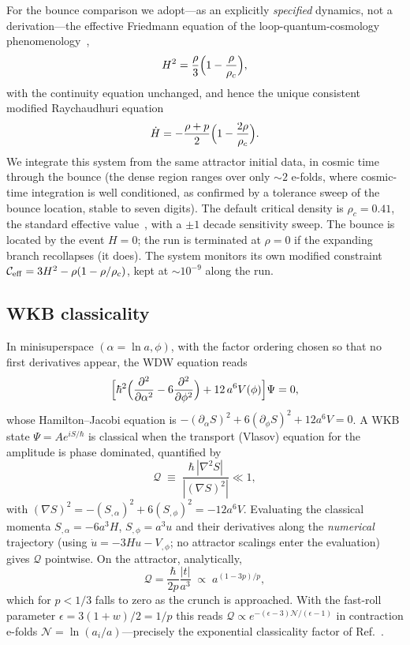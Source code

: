 \documentclass[11pt,a4paper]{article}
\newcommand{\rhoc}{\rho_c}
\newcommand{\cQ}{\mathcal{Q}}
\begin{document}
For the bounce comparison we adopt---as an explicitly \emph{specified}
dynamics, not a derivation---the effective Friedmann equation of the
loop-quantum-cosmology phenomenology~\cite{Ashtekar:2006wn},
\begin{equation}
  H^2=\frac{\rho}{3}\Bigl(1-\frac{\rho}{\rhoc}\Bigr),
  \label{eq:eff-friedmann}
\end{equation}
with the continuity equation unchanged, and hence the unique consistent
modified Raychaudhuri equation
\begin{equation}
  \dot H=-\frac{\rho+p}{2}\Bigl(1-\frac{2\rho}{\rhoc}\Bigr).
  \label{eq:eff-ray}
\end{equation}
We integrate this system from the same attractor initial data, in cosmic
time through the bounce (the dense region ranges over only $\sim\!2$
e-folds, where cosmic-time integration is well conditioned, as confirmed by
a tolerance sweep of the bounce location, stable to seven digits).
The default critical density is $\rhoc=0.41$, the standard effective
value~\cite{Ashtekar:2006wn}, with a $\pm1$ decade sensitivity sweep. The
bounce is located by the event $H=0$; the run is terminated at $\rho=0$ if
the expanding branch recollapses (it does). The system monitors its own
modified constraint $\mathcal C_{\rm eff}=3H^2-\rho(1-\rho/\rhoc)$, kept at
$\sim10^{-9}$ along the run.

\subsection{WKB classicality}

In minisuperspace $(\alpha=\ln a,\phi)$, with the factor ordering chosen so
that no first derivatives appear, the WDW equation reads
\begin{equation}
  \Bigl[\hbar^2\Bigl(\frac{\partial^2}{\partial\alpha^2}
  -6\frac{\partial^2}{\partial\phi^2}\Bigr)
  +12\,a^6 V(\phi)\Bigr]\Psi=0 ,
  \label{eq:wdw}
\end{equation}
whose Hamilton--Jacobi equation is
$-(\partial_\alpha S)^2+6(\partial_\phi S)^2+12a^6V=0$.
A WKB state $\Psi=A e^{iS/\hbar}$ is classical when the transport (Vlasov)
equation for the amplitude is phase dominated, quantified
by~\cite{Lehners:2015,BattarraLehners:2014}
\begin{equation}
  \cQ\;\equiv\;\frac{\hbar\,|\nabla^2S|}{|(\nabla S)^2|}\ll1 ,
  \label{eq:Q}
\end{equation}
with $(\nabla S)^2=-(S_{,\alpha})^2+6(S_{,\phi})^2=-12a^6V$. Evaluating the
classical momenta $S_{,\alpha}=-6a^3H$, $S_{,\phi}=a^3 u$ and their
derivatives along the \emph{numerical} trajectory (using
$\dot u=-3Hu-V_{,\phi}$; no attractor scalings enter the evaluation) gives
$\cQ$ pointwise. On the attractor, analytically,
\begin{equation}
  \cQ=\frac{\hbar}{2p}\frac{|t|}{a^3}\;\propto\;a^{(1-3p)/p},
  \label{eq:Qscaling}
\end{equation}
which for $p<1/3$ falls to zero as the crunch is approached. With the
fast-roll parameter $\epsilon=3(1+w)/2=1/p$ this reads
$\cQ\propto e^{-(\epsilon-3)\mathcal N/(\epsilon-1)}$ in contraction
e-folds $\mathcal N=\ln(a_i/a)$---precisely the exponential classicality
factor of Ref.~\cite{Lehners:2015}.
\end{document}
